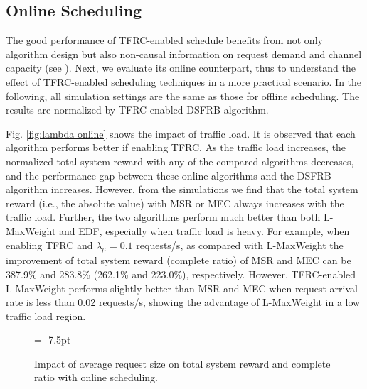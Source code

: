 \documentclass[journal,letterpaper,12pt,oneside,onecolumn,draftclsnofoot]{IEEEtran}
\begin{document}
\subsection{Online Scheduling}

The good performance of TFRC-enabled schedule benefits from not only algorithm design but also non-causal information on request demand and channel capacity (see \cite{Shan_TWC_submitted}). Next, we evaluate its online counterpart, thus to understand the effect of TFRC-enabled scheduling techniques in a more practical scenario.
In the following, all simulation settings are the same as those for offline scheduling. The results are normalized by TFRC-enabled DSFRB algorithm.



Fig. \ref{fig:lambda online} shows the impact of traffic load. It is observed that each algorithm performs better if enabling TFRC. As the traffic load increases, the normalized total system reward with any of the compared algorithms decreases, and the performance gap between these online algorithms and the DSFRB algorithm increases. However, from the simulations we find that the total system reward (i.e., the absolute value) with MSR or MEC always increases with the traffic load.
Further, the two algorithms perform much better than both L-MaxWeight and EDF, especially when traffic load is heavy. For example, when enabling TFRC and ${{\lambda }_{\mu }} = 0.1$ requests/s, as compared with L-MaxWeight the improvement of total system reward (complete ratio) of MSR and MEC can be 387.9\% and 283.8\% (262.1\% and 223.0\%), respectively.
However, TFRC-enabled L-MaxWeight performs slightly better than MSR and MEC when request arrival rate is less than 0.02 requests/s, showing the advantage of L-MaxWeight in a low traffic load region.



\vspace{-0.35cm}
\begin{figure*}[htp]
\subfigcapskip = -7.5pt
\centering
{}
\vspace{-0.3cm}
\caption{Impact of average request size on total system reward and complete ratio with online scheduling.}
\label{fig:data online}
\vspace{-0.4cm}
\end{figure*}
\end{document}
